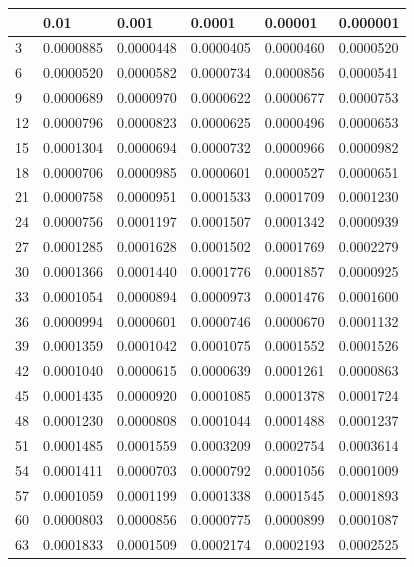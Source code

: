 \documentclass{article}
\begin{document}
\begin{table}[H]
\centering
\begin{tabular}{|l|l|l|l|l|l|}
\hline
& 0.01 & 0.001 & 0.0001 & 0.00001 & 0.000001 \\ \hline
3 & 0.0000885 & 0.0000448 & 0.0000405 & 0.0000460 & 0.0000520 \\ \hline
6 & 0.0000520 & 0.0000582 & 0.0000734 & 0.0000856 & 0.0000541 \\ \hline
9 & 0.0000689 & 0.0000970 & 0.0000622 & 0.0000677 & 0.0000753 \\ \hline
12 & 0.0000796 & 0.0000823 & 0.0000625 & 0.0000496 & 0.0000653 \\ \hline
15 & 0.0001304 & 0.0000694 & 0.0000732 & 0.0000966 & 0.0000982 \\ \hline
18 & 0.0000706 & 0.0000985 & 0.0000601 & 0.0000527 & 0.0000651 \\ \hline
21 & 0.0000758 & 0.0000951 & 0.0001533 & 0.0001709 & 0.0001230 \\ \hline
24 & 0.0000756 & 0.0001197 & 0.0001507 & 0.0001342 & 0.0000939 \\ \hline
27 & 0.0001285 & 0.0001628 & 0.0001502 & 0.0001769 & 0.0002279 \\ \hline
30 & 0.0001366 & 0.0001440 & 0.0001776 & 0.0001857 & 0.0000925 \\ \hline
33 & 0.0001054 & 0.0000894 & 0.0000973 & 0.0001476 & 0.0001600 \\ \hline
36 & 0.0000994 & 0.0000601 & 0.0000746 & 0.0000670 & 0.0001132 \\ \hline
39 & 0.0001359 & 0.0001042 & 0.0001075 & 0.0001552 & 0.0001526 \\ \hline
42 & 0.0001040 & 0.0000615 & 0.0000639 & 0.0001261 & 0.0000863 \\ \hline
45 & 0.0001435 & 0.0000920 & 0.0001085 & 0.0001378 & 0.0001724 \\ \hline
48 & 0.0001230 & 0.0000808 & 0.0001044 & 0.0001488 & 0.0001237 \\ \hline
51 & 0.0001485 & 0.0001559 & 0.0003209 & 0.0002754 & 0.0003614 \\ \hline
54 & 0.0001411 & 0.0000703 & 0.0000792 & 0.0001056 & 0.0001009 \\ \hline
57 & 0.0001059 & 0.0001199 & 0.0001338 & 0.0001545 & 0.0001893 \\ \hline
60 & 0.0000803 & 0.0000856 & 0.0000775 & 0.0000899 & 0.0001087 \\ \hline
63 & 0.0001833 & 0.0001509 & 0.0002174 & 0.0002193 & 0.0002525 \\ \hline

\end{tabular}
\end{table}
\end{document}
